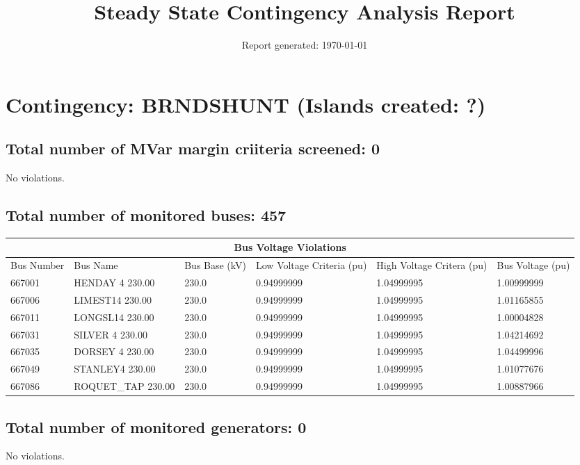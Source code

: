 \documentclass{article}%
\title{Steady State Contingency Analysis Report\vspace{-3ex}}%
\date{Report generated: \today\vspace{-2ex}}%
\begin{document}
%
\normalsize%
\maketitle%
\section*{Contingency: BRNDSHUNT (Islands created: ?)}%
\label{sec:ContingencyBRNDSHUNT(Islandscreated?)}%
\subsection*{Total number of MVar margin criiteria screened: 0}%
\label{subsec:TotalnumberofMVarmargincriiteriascreened0}%
No violations.

%
\subsection*{Total number of monitored buses: 457}%
\label{subsec:Totalnumberofmonitoredbuses457}%
\begin{tabularx}{\textwidth}{|  X |p{4cm} | X | X | X | X |}%
\hline%
\multicolumn{6}{|c|}{Bus Voltage Violations}\\%
\hline%
Bus Number&Bus Name&Bus Base (kV)&Low Voltage Criteria (pu)&High Voltage Critera (pu)&Bus Voltage (pu)\\%
\hline%
667001&HENDAY 4    230.00&230.0&0.94999999&1.04999995&1.00999999\\%
\hline%
\hline%
667006&LIMEST14    230.00&230.0&0.94999999&1.04999995&1.01165855\\%
\hline%
\hline%
667011&LONGSL14    230.00&230.0&0.94999999&1.04999995&1.00004828\\%
\hline%
\hline%
667031&SILVER 4    230.00&230.0&0.94999999&1.04999995&1.04214692\\%
\hline%
\hline%
667035&DORSEY 4    230.00&230.0&0.94999999&1.04999995&1.04499996\\%
\hline%
\hline%
667049&STANLEY4    230.00&230.0&0.94999999&1.04999995&1.01077676\\%
\hline%
\hline%
667086&ROQUET\_TAP  230.00&230.0&0.94999999&1.04999995&1.00887966\\%
\hline%
\end{tabularx}

%
\subsection*{Total number of monitored generators: 0}%
\label{subsec:Totalnumberofmonitoredgenerators0}%
No violations.
\end{document}
